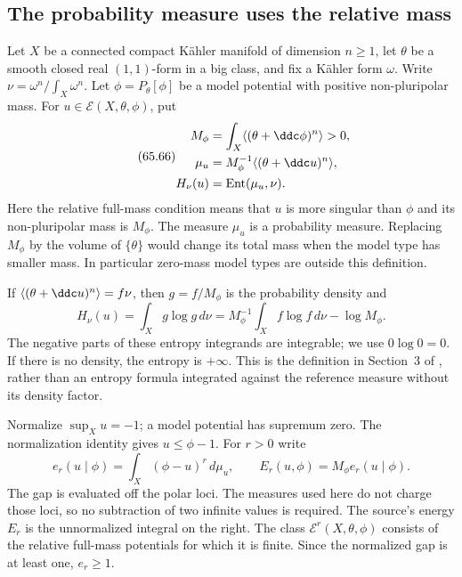 \subsection{The probability measure uses the relative mass}

Let $X$ be a connected compact K\"ahler manifold of dimension $n\geq1$,
let $\theta$ be a smooth closed real $(1,1)$-form in a big class, and
fix a K\"ahler form $\omega$. Write
$\nu=\omega^n/\int_X\omega^n$. Let $\phi=P_\theta[\phi]$ be a
model potential with positive non-pluripolar mass. For
$u\in\mathcal E(X,\theta,\phi)$, put
\[
\tag{65.66}\label{eq:rf-relative-entropy-measure}
 \begin{aligned}
 M_\phi&=\int_X\langle(\theta+\ddc\phi)^n\rangle>0,\\
 \mu_u&=M_\phi^{-1}\langle(\theta+\ddc u)^n\rangle,\\
 H_\nu(u)&=\operatorname{Ent}(\mu_u,\nu).
 \end{aligned}
\]
Here the relative full-mass condition means that $u$ is more singular
than $\phi$ and its non-pluripolar mass is $M_\phi$.
The measure $\mu_u$ is a probability measure. Replacing $M_\phi$ by
the volume of $\{\theta\}$ would change its total mass when the
model type has smaller mass. In particular zero-mass model types are
outside this definition.

If $\langle(\theta+\ddc u)^n\rangle=f\nu$, then
$g=f/M_\phi$ is the probability density and
\[
 H_\nu(u)=\int_Xg\log g\,d\nu
  =M_\phi^{-1}\int_Xf\log f\,d\nu-\log M_\phi.
\]
The negative parts of these entropy integrands are integrable; we use
$0\log0=0$. If there is no density, the entropy is $+\infty$.
This is the definition in Section~3 of
\cite{DNTT24EntropyPublished}, rather than an entropy formula integrated
against the reference measure without its density factor.

Normalize $\sup_Xu=-1$; a model potential has supremum zero.
The normalization identity
\cite[Lemma~3.5]{DDL23RelativeV2} gives $u\leq\phi-1$.
For $r>0$ write
\[
\tag{65.67}\label{eq:rf-relative-normalized-energy}
 e_r(u\mid\phi)
  =\int_X(\phi-u)^r\,d\mu_u,
 \qquad E_r(u,\phi)=M_\phi e_r(u\mid\phi).
\]
The gap is evaluated off the polar loci. The measures used here do not
charge those loci, so no subtraction of two infinite values is required.
The source's energy $E_r$ is the unnormalized integral on the right.
The class $\mathcal E^r(X,\theta,\phi)$ consists of the relative
full-mass potentials for which it is finite. Since the normalized gap
is at least one, $e_r\geq1$.

